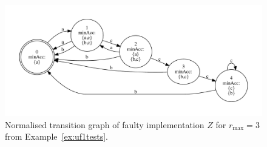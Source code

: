 \documentclass[3p,times]{elsarticle}
\begin{document}
 \begin{figure}
 \begin{center}
\includegraphics[trim=0cm 1.4cm 0cm 1.4cm,clip,scale=.6,%
                 ]{z.pdf}
\end{center}
\caption{Normalised transition graph of faulty implementation $Z$ for $r_\text{max} = 3$ from Example~\ref{ex:uf1tests}.}
 \label{fig:tgZ}
 \end{figure}
\end{document}
